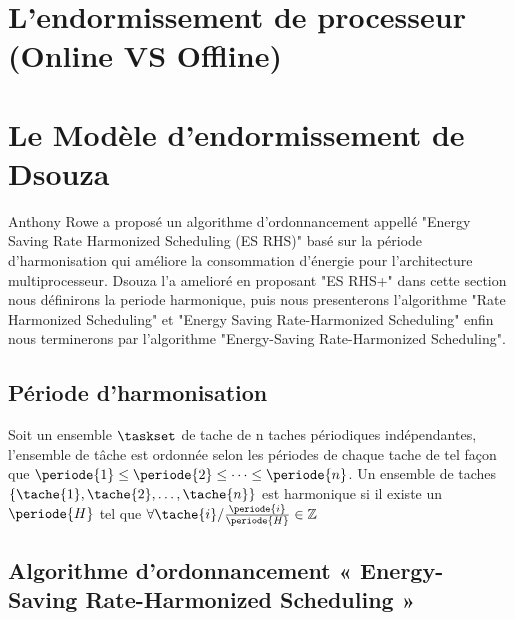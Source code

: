 \section{L'endormissement de processeur (Online VS Offline)}
\vspace{-1cm}
\section{Le Modèle d'endormissement de Dsouza}
\vspace{-1cm}
Anthony Rowe a proposé un algorithme d’ordonnancement appellé "Energy Saving Rate Harmonized Scheduling (ES RHS)" \cite{Rowe10} basé sur la période d’harmonisation qui améliore la consommation d’énergie pour l’architecture multiprocesseur.
Dsouza l'a amelioré en proposant "ES RHS+" dans cette section nous définirons la periode harmonique, puis nous presenterons l'algorithme "Rate Harmonized Scheduling" et "Energy Saving Rate-Harmonized Scheduling" enfin nous terminerons par l'algorithme "Energy-Saving Rate-Harmonized Scheduling".

\subsection{Période d’harmonisation}

Soit un ensemble $\taskset$ de tache de n taches périodiques indépendantes, l’ensemble de tâche est ordonnée selon les périodes de chaque tache de tel façon que $\periode{1} \leq \periode{2} \leq \dots \leq \periode{n}$. 
Un ensemble de taches $\{\tache{1}, \tache{2}, \dots, \tache{n} \}$ est harmonique si il existe un $\periode{H}$ tel que $\forall \tache{i} / \frac{\periode{i}}{\periode{H}} \in \mathbb{Z}$

\subsection{Algorithme d’ordonnancement « Energy-Saving Rate-Harmonized Scheduling »}

